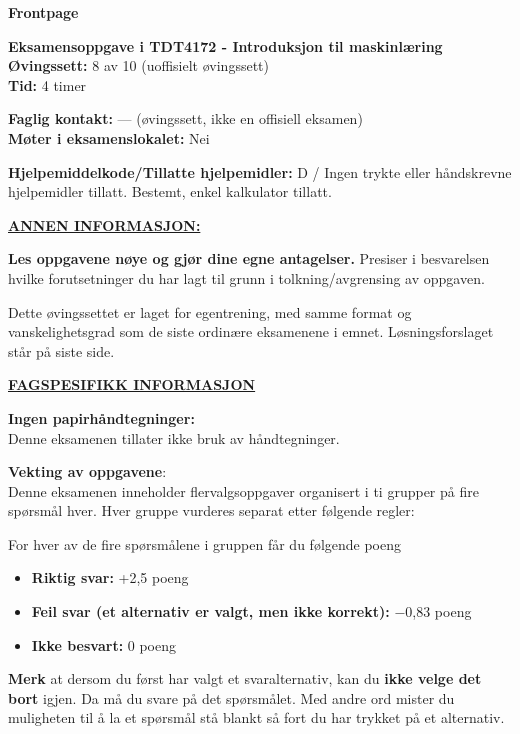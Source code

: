 \documentclass[11pt,a4paper]{article}
\begin{document}
\noindent\hspace*{-1.55em}%
{\sffamily\bfseries\fontsize{18}{22}\selectfont Frontpage}\par\vspace{1.1em}

{\bfseries Eksamensoppgave i TDT4172 - Introduksjon til maskinlæring}\\
{\bfseries Øvingssett:} 8 av 10 (uoffisielt øvingssett)\\
{\bfseries Tid:} 4 timer

\vspace{0.6em}
{\bfseries Faglig kontakt:} --- (øvingssett, ikke en offisiell eksamen)\\
{\bfseries Møter i eksamenslokalet:} Nei

\vspace{0.6em}
{\bfseries Hjelpemiddelkode/Tillatte hjelpemidler:} D / Ingen trykte eller håndskrevne hjelpemidler tillatt.
Bestemt, enkel kalkulator tillatt.

\vspace{0.6em}
{\bfseries\underline{ANNEN INFORMASJON:}}

\vspace{0.4em}
{\bfseries Les oppgavene nøye og gjør dine egne antagelser.} Presiser i besvarelsen hvilke forutsetninger du
har lagt til grunn i tolkning/avgrensing av oppgaven.

Dette øvingssettet er laget for egentrening, med samme format og vanskelighetsgrad som de
siste ordinære eksamenene i emnet. Løsningsforslaget står på siste side.

\vspace{1.6em}
{\bfseries\underline{FAGSPESIFIKK INFORMASJON}}

\vspace{0.4em}
{\bfseries Ingen papirhåndtegninger:}\\
Denne eksamenen tillater ikke bruk av håndtegninger.

\vspace{1.4em}
{\bfseries Vekting av oppgavene}:\\
Denne eksamenen inneholder flervalgsoppgaver organisert i ti grupper på fire spørsmål hver. Hver
gruppe vurderes separat etter følgende regler:

\vspace{0.6em}
For hver av de fire spørsmålene i gruppen får du følgende poeng
\begin{itemize}[leftmargin=2.2em,label=\textperiodcentered,itemsep=0pt]
\item {\bfseries Riktig svar:} +2,5 poeng
\item {\bfseries Feil svar (et alternativ er valgt, men ikke korrekt):} $-$0,83 poeng
\item {\bfseries Ikke besvart:} 0 poeng
\end{itemize}
{\bfseries Merk} at dersom du først har valgt et svaralternativ, kan du {\bfseries ikke velge det bort} igjen. Da må du
svare på det spørsmålet. Med andre ord mister du muligheten til å la et spørsmål stå blankt så fort
du har trykket på et alternativ.
\end{document}
